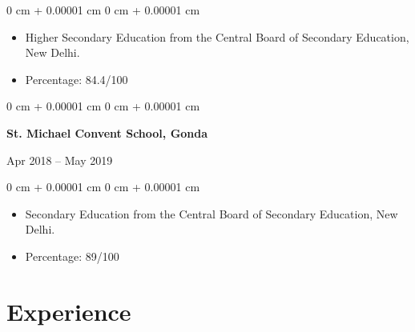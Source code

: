 \documentclass[10pt, letterpaper]{article}
\newenvironment{highlights}{
    \begin{itemize}[
        topsep=0.10 cm,
        parsep=0.10 cm,
        partopsep=0pt,
        itemsep=0pt,
        leftmargin=0 cm + 10pt
    ]
}{
    \end{itemize}
} %
\newenvironment{onecolentry}{
    \begin{adjustwidth}{
        0 cm + 0.00001 cm
    }{
        0 cm + 0.00001 cm
    }
}{
    \end{adjustwidth}
} %
\newenvironment{twocolentry}[2][]{
    \onecolentry
    \def\secondColumn{#2}
    \setcolumnwidth{\fill, 4.5 cm}
    \begin{paracol}{2}
}{
    \switchcolumn \raggedleft \secondColumn
    \end{paracol}
    \endonecolentry
} %
\begin{document}
\vspace{0.10 cm}
\begin{onecolentry}
    \begin{highlights}
        \item Higher Secondary Education from the Central Board of Secondary Education, New Delhi.
        \item Percentage: 84.4/100
    \end{highlights}
\end{onecolentry}
\vspace{0.10 cm}
\begin{twocolentry}{Apr 2018 – May 2019}
    \textbf{St. Michael Convent School, Gonda}
\end{twocolentry}

\vspace{0.10 cm}
\begin{onecolentry}
    \begin{highlights}
        \item Secondary Education from the Central Board of Secondary Education, New Delhi.
        \item Percentage: 89/100
    \end{highlights}
\end{onecolentry}

\vspace{-0.10 cm}



\vspace{-0.10 cm}


\section{Experience}
\end{document}
